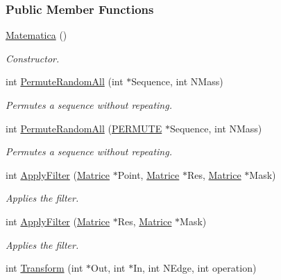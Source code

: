 \subsubsection*{Public Member Functions}
\begin{DoxyCompactItemize}
\item 
\hyperlink{classMatematica_ad7fef8b66845538830977c8db143e9ae}{Matematica} ()\hypertarget{classMatematica_ad7fef8b66845538830977c8db143e9ae}{}\label{classMatematica_ad7fef8b66845538830977c8db143e9ae}

\begin{DoxyCompactList}\small\item\em Constructor. \end{DoxyCompactList}\item 
int \hyperlink{classMatematica_ab5122ddcd9bce12ff5049a5ad2b5cb6d}{Permute\+Random\+All} (int $\ast$Sequence, int N\+Mass)\hypertarget{classMatematica_ab5122ddcd9bce12ff5049a5ad2b5cb6d}{}\label{classMatematica_ab5122ddcd9bce12ff5049a5ad2b5cb6d}

\begin{DoxyCompactList}\small\item\em Permutes a sequence without repeating. \end{DoxyCompactList}\item 
int \hyperlink{classMatematica_a5ee47a0f414d52f4d97c5266677cc952}{Permute\+Random\+All} (\hyperlink{structPERMUTE}{P\+E\+R\+M\+U\+TE} $\ast$Sequence, int N\+Mass)\hypertarget{classMatematica_a5ee47a0f414d52f4d97c5266677cc952}{}\label{classMatematica_a5ee47a0f414d52f4d97c5266677cc952}

\begin{DoxyCompactList}\small\item\em Permutes a sequence without repeating. \end{DoxyCompactList}\item 
int \hyperlink{classMatematica_a486baea1c22d2accfe267ef415b3abaf}{Apply\+Filter} (\hyperlink{classMatrice}{Matrice} $\ast$Point, \hyperlink{classMatrice}{Matrice} $\ast$Res, \hyperlink{classMatrice}{Matrice} $\ast$Mask)
\begin{DoxyCompactList}\small\item\em Applies the filter. \end{DoxyCompactList}\item 
int \hyperlink{classMatematica_a4b258fe1b33ec22774aa535d1390c746}{Apply\+Filter} (\hyperlink{classMatrice}{Matrice} $\ast$Res, \hyperlink{classMatrice}{Matrice} $\ast$Mask)
\begin{DoxyCompactList}\small\item\em Applies the filter. \end{DoxyCompactList}\item 
int \hyperlink{classMatematica_a3c54bdff136c7c0107e035f80232c00f}{Transform} (int $\ast$Out, int $\ast$In, int N\+Edge, int operation)\hypertarget{classMatematica_a3c54bdff136c7c0107e035f80232c00f}{}\label{classMatematica_a3c54bdff136c7c0107e035f80232c00f}


\end{DoxyCompactItemize}
